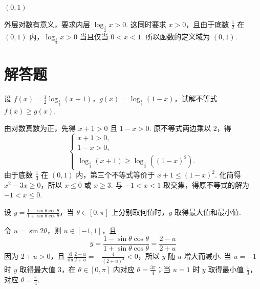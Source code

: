 \begin{answer}
\(\left( 0,1 \right)\)
\end{answer}

\begin{solution}
外层对数有意义，要求内层 \(\log_{\frac12}x>0\). 这同时要求 \(x>0\)，且由于底数 \(\frac12\) 在 \((0,1)\) 内，\(\log_{\frac12}x>0\) 当且仅当 \(0<x<1\). 所以函数的定义域为 \((0,1)\).
\end{solution}

\section{解答题}

\begin{problem}

设 \(f(x)=\frac{1}{2}\log_{\frac{1}{3}}(x+1)\)，\(g(x)=\log_{\frac{1}{3}}(1-x)\)，试解不等式 \(f(x)\geqslant g(x)\).
\end{problem}

\begin{solution}
由对数真数为正，先得 \(x+1>0\) 且 \(1-x>0\). 原不等式两边乘以 \(2\)，得
\[
\begin{cases}
x+1>0,\\
1-x>0,\\
\log_{\frac{1}{3}}(x+1)\geqslant \log_{\frac{1}{3}}\left((1-x)^2\right).
\end{cases}
\]
由于底数 \(\frac13\) 在 \((0,1)\) 内，第三个不等式等价于 \(x+1\leqslant(1-x)^2\). 化简得 \(x^2-3x\geqslant0\)，所以 \(x\leqslant0\) 或 \(x\geqslant3\). 与 \(-1<x<1\) 取交集，得原不等式的解为 \(-1<x\leqslant0\).
\end{solution}

\begin{problem}

设 \(y=\frac{1-\sin\theta\cos\theta}{1+\sin\theta\cos\theta} \)，当 \(\theta\in[0,\pi] \) 上分别取何值时，\(y\) 取得最大值和最小值.
\end{problem}

\begin{solution}
令 \(u=\sin2\theta\)，则 \(u\in[-1,1]\)，且
\[
y=\frac{1-\sin\theta\cos\theta}{1+\sin\theta\cos\theta}=\frac{2-u}{2+u}
\]
因为 \(2+u>0\)，且 \(\frac{\mathrm d}{\mathrm du}\frac{2-u}{2+u}=-\frac{4}{(2+u)^2}<0\)，所以 \(y\) 随 \(u\) 增大而减小. 当 \(u=-1\) 时 \(y\) 取得最大值 \(3\)，在 \(\theta\in[0,\pi]\) 内对应 \(\theta=\frac{3\pi}{4}\)；当 \(u=1\) 时 \(y\) 取得最小值 \(\frac13\)，对应 \(\theta=\frac{\pi}{4}\).
\end{solution}

